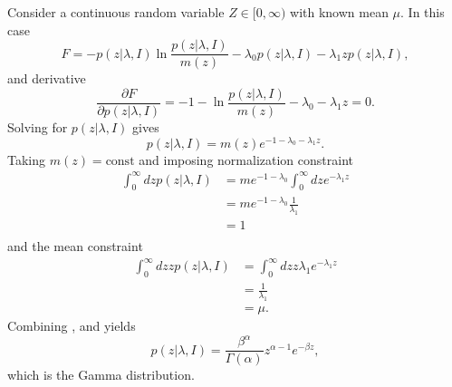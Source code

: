 \begin{example}
	Consider a continuous random variable $Z \in [0,\infty)$ with known mean $\mu$. In this case
	\begin{equation}
		F = - p(z|\lambda,I) \ln \frac{p(z|\lambda,I)}{m(z)} - \lambda_0 p(z|\lambda,I) - \lambda_1 z p(z|\lambda,I),
	\end{equation}
	and derivative
	\begin{equation}
		\frac{\partial F}{\partial p(z|\lambda,I)} = -1 - \ln\frac{p(z|\lambda,I)}{m(z)} - \lambda_0 - \lambda_1 z = 0.
	\end{equation}
	Solving for $p(z|\lambda,I)$ gives
	\begin{equation}
		p(z|\lambda,I) = m(z) e^{-1-\lambda_0 - \lambda_1 z}.
		\label{eq:n13}
	\end{equation}
	Taking $m(z) = \text{const}$ and imposing normalization constraint
	\begin{equation}
		\begin{split}
			\int_0^\infty dz p(z|\lambda,I) &= m e^{-1-\lambda_0}\int_0^\infty dz e^{- \lambda_1 z}\\
			& = m e^{-1-\lambda_0} \frac{1}{\lambda_1}\\
			&= 1\\
		\end{split}
		\label{eq:na1}
	\end{equation}
	and the mean constraint
	\begin{equation}
		\begin{split}
			\int_0^\infty dz z p(z|\lambda,I) &= \int_0^\infty dz z \lambda_1 e^{-\lambda_1 z}\\
			& = \frac{1}{\lambda_1}\\
			&= \mu.
		\end{split}
		\label{eq:na2}
	\end{equation}
	Combining ,  and  yields
	\begin{equation}
		p(z|\lambda,I) = \frac{\beta^\alpha}{\Gamma(\alpha)} z^{\alpha-1} e^{-\beta z},
	\end{equation}
	which is the Gamma distribution.
\end{example}



